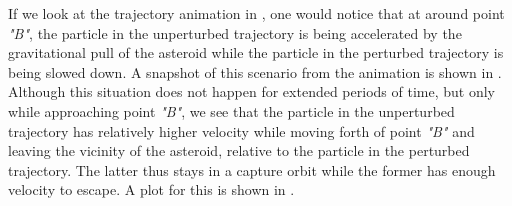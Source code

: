 \FloatBarrier
If we look at the trajectory animation in , one would notice that at around point \textit{"B"}, the particle in the unperturbed trajectory is being accelerated by the gravitational pull of the asteroid while the particle in the perturbed trajectory is being slowed down. A snapshot of this scenario from the animation is shown in . Although this situation does not happen for extended periods of time, but only while approaching point \textit{"B"}, we see that the particle in the unperturbed trajectory has relatively higher velocity while moving forth of point \textit{"B"} and leaving the vicinity of the asteroid, relative to the particle in the perturbed trajectory. The latter thus stays in a capture orbit while the former has enough velocity to escape. A plot for this is shown in .

